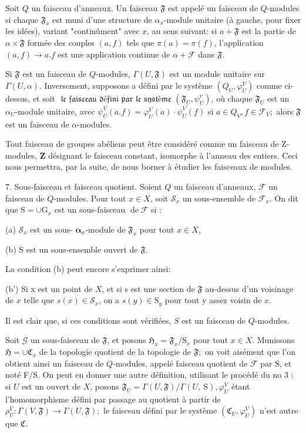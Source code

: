 Soit $Q$ un faisceau d'anneaux. Un faisceau $\mathfrak{F}$ est appelé un faisceau de $Q$-modules si chaque $\mathfrak{F}_{x}$ est muni d'une structure de $\alpha_{x}$-module unitaire (à gauche, pour fixer les idées), variant "continûment" avec $x$, au sens suivant: si $a+\mathfrak{F}$ est la partie de $\alpha \times \mathfrak{F}$ formée des couples $(a, f)$ tels que $\pi(a)=\pi(f)$, l'application $(a, f) \rightarrow a . f$ est une application continue de $\alpha+\mathscr{F}$ dans $\mathfrak{F}$.

Si $\mathfrak{F}$ est un faisceau de $Q$-modules, $\Gamma(U, \mathfrak{F})$ est un module unitaire sur $\Gamma(U, \alpha)$. Inversement, supposons a défini par le système $\left(Q_{U}, \varphi_{U}^{V}\right)$ comme ci-dessus, et soit $\mathfrak{\text { le faisceau défini par le système }}\left(\mathfrak{F}_{U}, \psi_{U}^{v}\right)$, où chaque $\mathfrak{F}_{U}$ est un $\alpha_{U}$-module unitaire, avec $\psi_{U}^{V}(a . f)=\varphi_{U}^{V}(a) \cdot \psi_{U}^{V}(f)$ si $a \in Q_{V}, f \in \mathcal{F}_{V} ;$ alors $\mathfrak{F}$ est un faisceau de $\alpha$-modules.

Tout faisceau de groupes abéliens peut être considéré comme un faisceau de Z-modules, $\mathbf{Z}$ désignant le faisceau constant, isomorphe à l'anneau des entiers. Ceci nous permettra, par la suite, de nous borner à étudier les faisceaux de modules.

7. Sous-faisceau et faisceau quotient. Soient $Q$ un faisceau d'anneaux, $\mathscr{F}$ un faisceau de $Q$-modules. Pour tout $x \in X$, soit $\mathcal{S}_{x}$ un sous-ensemble de $\mathcal{F}_{x} .$ On dit que $\mathrm{S}=\cup \mathrm{G}_{x}$ est un sous-faisceau $\operatorname{de} \mathcal{F}$ si :

(a) $\mathcal{S}_{x}$ est un sous- $\boldsymbol{\alpha}_{x}$-module de $\mathfrak{F}_{x}$ pour tout $x \in X$,

(b) S est un sous-ensemble ouvert de $\mathfrak{F}$.

La condition (b) peut encore s'exprimer ainsi:

(b') Si x est un point de $X$, et si s est une section de $\mathfrak{F}$ au-dessus d'un voisinage de $x$ telle que $s(x) \in \mathcal{S}_{x}$, on a $s(y) \in \mathrm{S}_{y}$ pour tout y assez voisin de $x$.

Il est clair que, si ces conditions sont vérifiées, $S$ est un faisceau de $Q$-modules.

Soit $\mathcal{G}$ un sous-faisceau de $\mathfrak{F}$, et posons $\mathfrak{H}_{x}=\mathfrak{F}_{x} / \mathrm{S}_{x}$ pour tout $x \in X .$ Munissons $\mathfrak{H}=\cup \mathfrak{C}_{x}$ de la topologie quotient de la topologie de $\mathfrak{F} ;$ on voit aisément que l'on obtient ainsi un faisceau de $Q$-modules, appelé faisceau quotient de $\mathcal{F}$ par $\mathrm{S}$, et noté F/S. On peut en donner une autre définition, utilisant le procédé du no 3 : si $U$ est un ouvert de $X$, posons $\mathfrak{F}_{U}=\Gamma(U, \mathfrak{F}) / \Gamma(U, \mathrm{~S}), \varphi_{U}^{V}$ étant l'homomorphisme défini par passage au quotient à partir de $\rho_{U}^{V}: \Gamma(V, \mathfrak{F}) \rightarrow \Gamma(U, \mathfrak{F}) ;$ le faisceau défini par le système $\left(\mathfrak{C}_{U}, \varphi_{U}^{V}\right)$ n'est autre que $\mathfrak{C}$.

